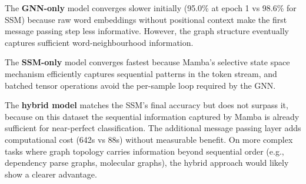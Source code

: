 \documentclass[11pt,a4paper]{article}
\begin{document}
The \textbf{GNN-only} model converges slower initially (95.0\% at epoch 1 vs 98.6\% for SSM) because raw word embeddings without positional context make the first message passing step less informative. However, the graph structure eventually captures sufficient word-neighbourhood information.

The \textbf{SSM-only} model converges fastest because Mamba's selective state space mechanism efficiently captures sequential patterns in the token stream, and batched tensor operations avoid the per-sample loop required by the GNN.

The \textbf{hybrid model} matches the SSM's final accuracy but does not surpass it, because on this dataset the sequential information captured by Mamba is already sufficient for near-perfect classification. The additional message passing layer adds computational cost (642s vs 88s) without measurable benefit. On more complex tasks where graph topology carries information beyond sequential order (e.g., dependency parse graphs, molecular graphs), the hybrid approach would likely show a clearer advantage.
\end{document}
